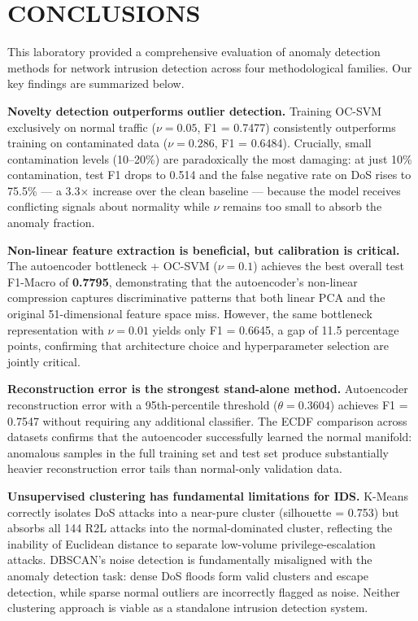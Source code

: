 
\section{CONCLUSIONS} \label{sec:conclusions}

This laboratory provided a comprehensive evaluation of anomaly detection methods for network intrusion detection across four methodological families.
Our key findings are summarized below.

\textbf{Novelty detection outperforms outlier detection.}
Training OC-SVM exclusively on normal traffic ($\nu = 0.05$, F1 = 0.7477) consistently outperforms training on contaminated data ($\nu = 0.286$, F1 = 0.6484).
Crucially, small contamination levels (10--20\%) are paradoxically the most damaging: at just 10\% contamination, test F1 drops to 0.514 and the false negative rate on DoS rises to 75.5\% --- a 3.3$\times$ increase over the clean baseline --- because the model receives conflicting signals about normality while $\nu$ remains too small to absorb the anomaly fraction.

\textbf{Non-linear feature extraction is beneficial, but calibration is critical.}
The autoencoder bottleneck + OC-SVM ($\nu = 0.1$) achieves the best overall test F1-Macro of \textbf{0.7795}, demonstrating that the autoencoder's non-linear compression captures discriminative patterns that both linear PCA and the original 51-dimensional feature space miss.
However, the same bottleneck representation with $\nu = 0.01$ yields only F1 = 0.6645, a gap of 11.5 percentage points, confirming that architecture choice and hyperparameter selection are jointly critical.

\textbf{Reconstruction error is the strongest stand-alone method.}
Autoencoder reconstruction error with a 95th-percentile threshold ($\theta = 0.3604$) achieves F1 = 0.7547 without requiring any additional classifier.
The ECDF comparison across datasets confirms that the autoencoder successfully learned the normal manifold: anomalous samples in the full training set and test set produce substantially heavier reconstruction error tails than normal-only validation data.

\textbf{Unsupervised clustering has fundamental limitations for IDS.}
K-Means correctly isolates DoS attacks into a near-pure cluster (silhouette = 0.753) but absorbs all 144 R2L attacks into the normal-dominated cluster, reflecting the inability of Euclidean distance to separate low-volume privilege-escalation attacks.
DBSCAN's noise detection is fundamentally misaligned with the anomaly detection task: dense DoS floods form valid clusters and escape detection, while sparse normal outliers are incorrectly flagged as noise.
Neither clustering approach is viable as a standalone intrusion detection system.

